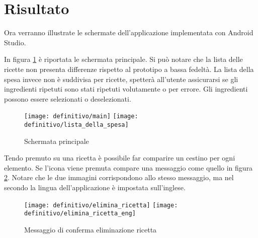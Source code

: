 



\section{Risultato}
Ora verranno illustrate le schermate dell'applicazione implementata con Android Studio.

In figura \ref{fig:def_main} è riportata le schermata principale.
Si può notare che la lista delle ricette non presenta differenze rispetto al prototipo a bassa fedeltà.
La lista della spesa invece non è suddivisa per ricette, spetterà all'utente assicurarsi se gli ingredienti ripetuti sono stati ripetuti volutamente o per errore.
Gli ingredienti possono essere selezionati o deselezionati.

\begin{figure}[ht]
  \begin{center}
    \texttt{[image: definitivo/main]}
    \texttt{[image: definitivo/lista\_della\_spesa]}
    \caption{Schermata principale}
    \label{fig:def_main}
  \end{center}
\end{figure}

Tendo premuto su una ricetta è possibile far comparire un cestino per ogni elemento.
Se l'icona viene premuta compare una messaggio come quello in figura \ref{fig:def_main_3}.
Notare che le due immagini corrispondono allo stesso messaggio, ma nel secondo la lingua dell'applicazione è impostata sull'inglese.

\begin{figure}[ht]
  \begin{center}
    \texttt{[image: definitivo/elimina\_ricetta]}
    \texttt{[image: definitivo/elimina\_ricetta\_eng]}
    \caption{Messaggio di conferma eliminazione ricetta}
    \label{fig:def_main_3}
  \end{center}
\end{figure}

